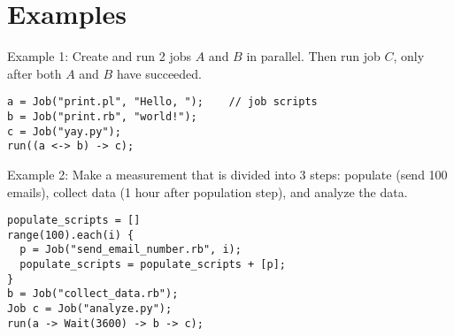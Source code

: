 \section{Examples}
\label{sect:ex}
Example 1: Create and run 2 jobs $A$ and $B$ in parallel.
Then run job $C$, only after both $A$ and $B$ have succeeded.
\begin{lstlisting}
a = Job("print.pl", "Hello, ");    // job scripts
b = Job("print.rb", "world!");
c = Job("yay.py");
run((a <-> b) -> c);
\end{lstlisting}
Example 2: Make a measurement that is divided into 3 steps: populate (send 100 emails), collect
data (1 hour after population step), and analyze the data.
\begin{lstlisting}
populate_scripts = []
range(100).each(i) {
  p = Job("send_email_number.rb", i);
  populate_scripts = populate_scripts + [p];
}
b = Job("collect_data.rb");
Job c = Job("analyze.py");
run(a -> Wait(3600) -> b -> c);
\end{lstlisting}


